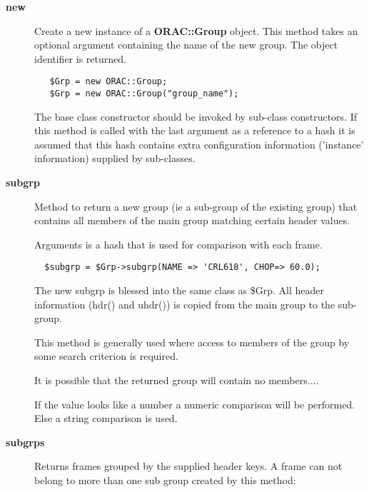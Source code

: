 \begin{description}

\item[\textbf{new}] \mbox{}

Create a new instance of a \textbf{ORAC::Group} object.
This method takes an optional argument containing the
name of the new group. The object identifier is returned.

\begin{verbatim}
   $Grp = new ORAC::Group;
   $Grp = new ORAC::Group("group_name");
\end{verbatim}


The base class constructor should be invoked by sub-class constructors.
If this method is called with the last argument as a reference to
a hash it is assumed that this hash contains extra configuration
information ('instance' information) supplied by sub-classes.


\item[\textbf{subgrp}] \mbox{}

Method to return a new group (ie a sub-group of the existing
group) that contains all members of the main group matching
certain header values.



Arguments is a hash that is used for comparison with each
frame.

\begin{verbatim}
  $subgrp = $Grp->subgrp(NAME => 'CRL618', CHOP=> 60.0);
\end{verbatim}


The new subgrp is blessed into the same class as \$Grp.
All header information (hdr() and uhdr()) is copied 
from the main group to the sub-group.



This method is generally used where access to members of the
group by some search criterion is required.



It is possible that the returned group will contain no 
members....



If the value looks like a number a numeric comparison will be performed.
Else a string comparison is used.


\item[\textbf{subgrps}] \mbox{}

Returns frames grouped by the supplied header keys.
A frame can not belong to more than one sub group created by this
method:


\end{description}

